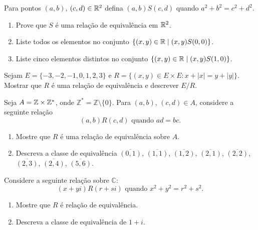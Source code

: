 \documentclass[12pt]{exam}
\begin{document}
    \questao{} Para pontos $(a, b)$, $(c, d) \in \mathbb{R}^2$ defina $(a, b) S (c, d)$ quando $a^2 + b^2 = c^2 + d^2$.
    \begin{enumerate}[label={\alph*})]
      \item Prove que $S$ \'e uma rela\c{c}\~ao de equival\^encia em $\mathbb{R}^2$.

      \item Liste todos os elementos no conjunto $\{(x, y) \in \mathbb{R} \mid (x, y) S (0, 0)\}$.

      \item Liste cinco elementos distintos no conjunto $\{(x, y) \in \mathbb{R} \mid (x, y) S (1, 0)\}$.
    \end{enumerate}

    \vspace{.3cm}

    \questao{} Sejam $E = \{-3, -2, -1, 0, 1, 2, 3\}$ e $R = \{(x, y) \in E \times E : x + |x| = y + |y|\}$. Mostrar que $R$ \'e uma rela\c{c}\~ao de equival\^encia e descrever $E/R$.

    \vspace{.3cm}

    \questao{} Seja $A = \mathbb{Z} \times \mathbb{Z}^*$, onde $\mathbb{Z}^* = \mathbb{Z} \setminus \{0\}$. Para $(a,b)$, $(c,d) \in A$, considere a seguinte rela{\c c}{\~a}o
    \[
        (a,b) R (c,d) \mbox{ quando } ad = bc.
    \]
    \begin{enumerate}[label={\alph*})]
        \item Mostre que $R$ {\'e} uma rela{\c c}{\~a}o de equival{\^e}ncia sobre $A$.

        \item Descreva a classe de equival{\^e}ncia $\overline{(0,1)}$, $\overline{(1,1)}$, $\overline{(1,2)}$, $\overline{(2,1)}$, $\overline{(2,2)}$, $\overline{(2,3)}$, $\overline{(2,4)}$, $\overline{(5,6)}$.
    \end{enumerate}

    \vspace{.3cm}



    \vspace{.3cm}

    \questao{} Considere a seguinte rela{\c c}{\~a}o sobre $\mathbb{C}$:
    \[
        (x+yi) R (r+si) \mbox{ quando } x^2+y^2=r^2+s^2.
    \]
    \begin{enumerate}[label={\alph*})]
        \item Mostre que $R$ {\'e} rela{\c c}{\~a}o de equival{\^e}ncia.

        \item Descreva a classe de equival{\^e}ncia de $1+i$.
    \end{enumerate}
\end{document}

